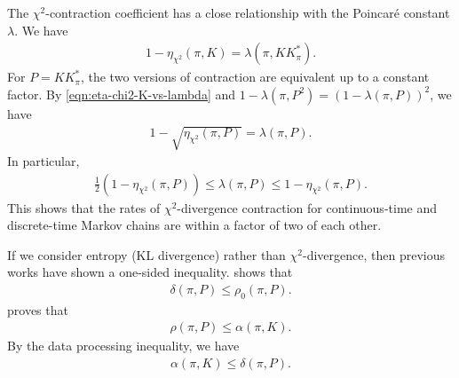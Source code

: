 \documentclass[11pt]{article}
\def\cX{\mathcal{X}}
\def\cY{\mathcal{Y}}
\DeclareMathOperator\KL{\mathrm{KL}}
\theoremstyle{definition}
\begin{document}
The $\chi^2$-contraction coefficient has a close relationship with the Poincar\'e constant $\lambda$.
We have
\begin{align} \label{eqn:eta-chi2-K-vs-lambda}
  1-\eta_{\chi^2}(\pi, K) = \lambda(\pi, KK_\pi^*).
\end{align}
For $P=KK_\pi^*$, the two versions of contraction are equivalent up to a constant factor.
By \cref{eqn:eta-chi2-K-vs-lambda} and $1-\lambda(\pi,P^2)=(1-\lambda(\pi,P))^2$, we have
\begin{align} \label{eqn:eta-chi2-P-vs-lambda}
  1-\sqrt{\eta_{\chi^2}(\pi, P)} = \lambda(\pi, P).
\end{align}
In particular,
\begin{align} \label{eqn:eta-chi2-P-vs-lambda-no-sep}
  \frac 12 \left(1-\eta_{\chi^2}(\pi, P)\right) \le \lambda(\pi, P) \le 1-\eta_{\chi^2}(\pi, P).
\end{align}
This shows that the rates of $\chi^2$-divergence contraction for continuous-time and discrete-time Markov chains are within a factor of two of each other.

If we consider entropy (KL divergence) rather than $\chi^2$-divergence, then previous works have shown a one-sided inequality.
\cite{blanca2021entropy} shows that
\begin{align} \label{eqn:delta-vs-rho0}
  \delta(\pi, P) \le \rho_0(\pi, P).
\end{align}
\cite{miclo1997remarques} proves that
\begin{align} \label{eqn:rho-vs-alpha}
  \rho(\pi, P) \le \alpha(\pi, K).
\end{align}
By the data processing inequality, we have
\begin{align} \label{eqn:alpha-vs-delta}
  \alpha(\pi, K) \le \delta(\pi, P).
\end{align}
\end{document}
